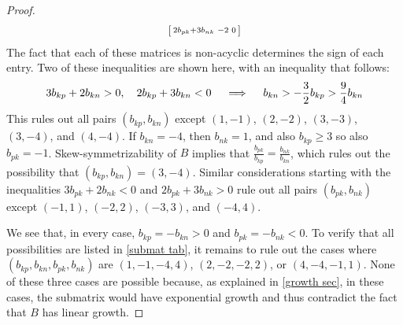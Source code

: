 \documentclass{amsart}
\theoremstyle{definition}
\theoremstyle{remark}
\numberwithin{equation}{section}
\newcommand{\0}{{\mathbf{0}}}
\begin{document}
\begin{proof}
\begin{multline*}
\begin{bsmallmatrix*}
	2b_{pk}+3b_{nk} & -2 & 0
\end{bsmallmatrix*}
\end{multline*}
The fact that each of these matrices is non-acyclic determines the sign of each entry.
Two of these inequalities are shown here, with an inequality that follows:
\[
3b_{kp}+2b_{kn}>0,\quad 2b_{kp}+3b_{kn}<0\quad \implies\quad b_{kn}>-\frac32b_{kp}>\frac94b_{kn}\\
\]
This rules out all pairs $(b_{kp},b_{kn})$ except $(1,-1)$, $(2,-2)$, $(3,-3)$, $(3,-4)$, and $(4,-4)$.
If $b_{kn}=-4$, then $b_{nk}=1$, and also $b_{kp}\ge3$ so also $b_{pk}=-1$.
Skew-symmetrizability of $B$ implies that $\frac{b_{pk}}{b_{kp}}=\frac{b_{nk}}{b_{kn}}$, which rules out the possibility that $(b_{kp},b_{kn})=(3,-4)$.
Similar considerations starting with the inequalities $3b_{pk}+2b_{nk}<0$ and $2b_{pk}+3b_{nk}>0$ rule out all pairs $(b_{pk},b_{nk})$ except $(-1,1)$, $(-2,2)$, $(-3,3)$, and $(-4,4)$.

We see that, in every case, $b_{kp}=-b_{kn}>0$ and $b_{pk}=-b_{nk}<0$.
To verify that all possibilities are listed in \cref{submat tab}, it remains to rule out the cases where $(b_{kp},b_{kn},b_{pk},b_{nk})$ are $(1,-1,-4,4)$, $(2,-2,-2,2)$, or $(4,-4,-1,1)$.
None of these three cases are possible because, as explained in \cref{growth sec}, in these cases, the submatrix would  have exponential growth and thus contradict the fact that $B$ has linear growth.


\end{proof}
\end{document}
